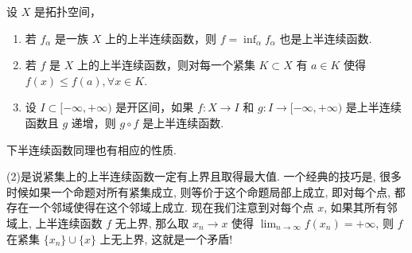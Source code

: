 \documentclass[../../main.tex]{subfiles}
\begin{document}
\begin{proposition}[上半连续函数基本性质]\label{proposition:半连续函数基本性质}
设 \(X\) 是拓扑空间，
\begin{enumerate}[(1)]
\item 若 \(f_{\alpha}\) 是一族 \(X\) 上的上半连续函数，则 \(f = \inf_{\alpha} f_{\alpha}\) 也是上半连续函数.
\item 若 \(f\) 是 \(X\) 上的上半连续函数，则对每一个紧集 \(K \subset X\) 有 \(a \in K\) 使得 \(f(x) \leq f(a),\forall x \in K\).
\item 设 \(I \subset [-\infty,+\infty)\) 是开区间，如果 \(f: X \to I\) 和 \(g: I \to [-\infty,+\infty)\) 是上半连续函数且 \(g\) 递增，则 \(g \circ f\) 是上半连续函数.
\end{enumerate}
\end{proposition}
\begin{remark}
下半连续函数同理也有相应的性质.
\end{remark}
\begin{note}
(2)是说紧集上的上半连续函数一定有上界且取得最大值. 一个经典的技巧是, 很多时候如果一个命题对所有紧集成立, 则等价于这个命题局部上成立, 即对每个点, 都存在一个邻域使得在这个邻域上成立. 现在我们注意到对每个点 \(x\), 如果其所有邻域上, 上半连续函数 \(f\) 无上界, 那么取 \(x_{n}\to x\) 使得 \(\lim_{n \to \infty}f(x_{n}) = +\infty\), 则 \(f\) 在紧集 \(\{x_{n}\}\cup\{x\}\) 上无上界, 这就是一个矛盾!
\end{note}
\end{document}
